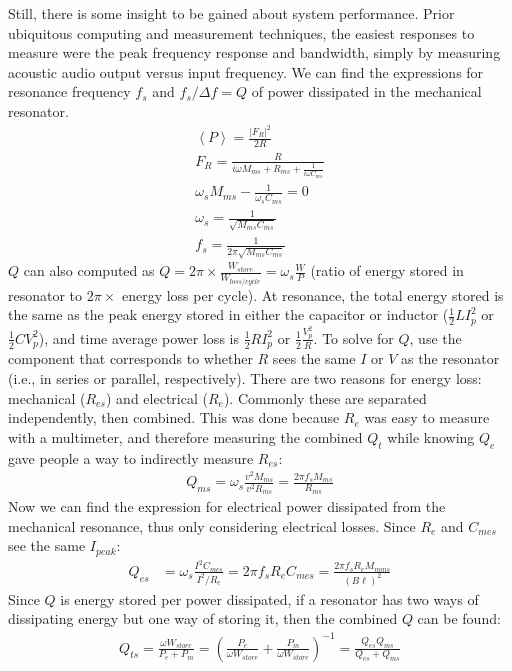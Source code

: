\documentclass[10pt,letterpaper]{article}
\begin{document}
Still, there is some insight to be gained about system performance. Prior ubiquitous computing and measurement techniques, the easiest responses to measure were the peak frequency response and bandwidth, simply by measuring acoustic audio output versus input frequency.  We can find the expressions for resonance frequency $f_s$ and $f_s/\Delta f = Q$ of power dissipated in the mechanical resonator.
\begin{align}
\left\langle P\right\rangle=\frac{\left|F_R \right|^2}{2R}\\
F_R=\frac{R}{i\omega M_{ms}+R_{ms}+\frac{1}{i\omega C_{ms}}}\\
\omega_s M_{ms}-\frac{1}{\omega_s C_{ms}}=0\\
\omega_s=\frac{1}{\sqrt{M_{ms}C_{ms}}}\\
f_s=\frac{1}{2\pi\sqrt{M_{ms}C_{ms}}}
\end{align}
$Q$ can also computed as $Q=2\pi\times\frac{W_{store}}{W_{loss/cycle}}=\omega_s\frac{W}{P}$ (ratio of energy stored in resonator to $2\pi\times$ energy loss per cycle). At resonance, the total energy stored is the same as the peak energy stored in either the capacitor or inductor ($\frac{1}{2}LI_p^2$ or $\frac{1}{2}CV_p^2$), and time average power loss is $\frac{1}{2}RI_p^2$ or $\frac{1}{2}\frac{V_p^2}{R}$. To solve for $Q$, use the component that corresponds to whether $R$ sees the same $I$ or $V$ as the resonator (i.e., in series or parallel, respectively). There are two reasons for energy loss: mechanical ($R_{es}$) and electrical ($R_{e}$). Commonly these are separated independently, then combined. This was done because $R_e$ was easy to measure with a multimeter, and therefore measuring the combined $Q_t$ while knowing $Q_e$ gave people a way to indirectly measure $R_{es}$:
\begin{align}
Q_{ms}=\omega_s\frac{v^2M_{ms}}{v^2R_{ms}}=\frac{2\pi f_s M_{ms}}{R_{ms}}
\end{align}
Now we can find the expression for electrical power dissipated from the mechanical resonance, thus only considering electrical losses. Since $R_e$ and $C_{mes}$ see the same $I_{peak}$: 
\begin{align}
Q_{es}&=\omega_s\frac{I^2 C_{mes}}{I^2/R_e}=2\pi f_s R_{e} C_{mes}=\frac{2\pi f_s R_{e} M_{mms}}{(B\ell)^2}
\end{align}
Since $Q$ is energy stored per power dissipated, if a resonator has two ways of dissipating energy but one way of storing it, then the combined $Q$ can be found:
\begin{align}
Q_{ts}=\frac{\omega W_{store}}{P_e+P_m}=\left(\frac{P_e}{\omega W_{store}}+\frac{P_m}{\omega W_{store}}\right)^{-1}=\frac{Q_{es}Q_{ms}}{Q_{es}+Q_{ms}}
\end{align}
\end{document}
